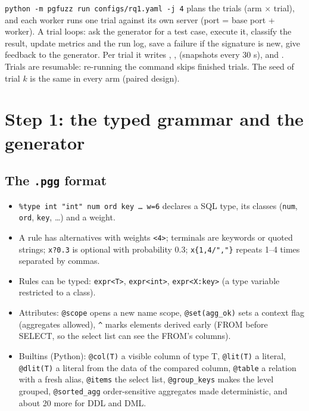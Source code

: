 \texttt{python -m pgfuzz run configs/rq1.yaml -j 4} plans the trials (arm
$\times$ trial), and each worker runs one trial against its own server
(port = base port + worker). A trial loops: ask the generator for a test case,
execute it, classify the result, update metrics and the run log, save a
failure if the signature is new, give feedback to the generator. Per trial it
writes , , 
(snapshots every 30 s),  and .
Trials are resumable: re-running the command skips finished trials. The seed of
trial $k$ is the same in every arm (paired design).

\section{Step 1: the typed grammar and the generator}
\label{sec:grammar}

\subsection{The \texttt{.pgg} format}

\begin{itemize}
  \item \texttt{\%type int "int" num ord key \dots{} w=6} declares a SQL type,
    its classes (\texttt{num}, \texttt{ord}, \texttt{key}, \dots) and a weight.
  \item A rule has alternatives with weights \texttt{<4>}; terminals are
    keywords or quoted strings; \texttt{x?0.3} is optional with probability
    0.3; \texttt{x\{1,4/","\}} repeats 1--4 times separated by commas.
  \item Rules can be typed: \texttt{expr<T>}, \texttt{expr<int>},
    \texttt{expr<X:key>} (a type variable restricted to a class).
  \item Attributes: \texttt{@scope} opens a new name scope,
    \texttt{@set(agg\_ok)} sets a context flag (aggregates allowed),
    \texttt{\^{}} marks elements derived early (FROM before SELECT, so the
    select list can see the FROM's columns).
  \item Builtins (Python): \texttt{@col(T)} a visible column of type T,
    \texttt{@lit(T)} a literal, \texttt{@dlit(T)} a literal from the data of the
    compared column, \texttt{@table} a relation with a fresh alias,
    \texttt{@items} the select list, \texttt{@group\_keys} makes the level
    grouped, \texttt{@sorted\_agg} order-sensitive aggregates made
    deterministic, and about 20 more for DDL and DML.
\end{itemize}

